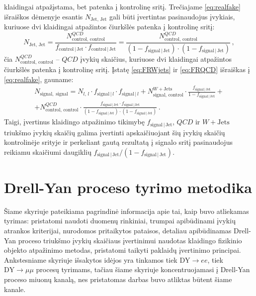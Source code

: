 \documentclass[a4paper, 12pt, oneside]{article}
\newcommand{\WJets}{W\! +\!\mathrm{Jets}}
\newcommand{\DYee}{\mathrm{DY} \! \rightarrow \! ee}
\newcommand{\DYmumu}{\mathrm{DY} \! \rightarrow \! \mu\mu}
\newcommand{\QCD}{QC\! D}
\newlength\q
\begin{document}
klaidingai atpažįstama, bet patenka į kontrolinę sritį.
Trečiajame \eqref{eq:realfake} išraiškos dėmenyje esantis $N_{\mathrm{Jet, \, Jet}}$ gali būti įvertintas pasinaudojus įvykiais,
kuriuose dvi klaidingai atpažintos čiurkšlės patenka į kontrolinę sritį:
\begin{equation}
	\label{eq:FRQCD}
	N_{\mathrm{Jet, \, Jet}} = \frac{N^{\QCD}_{\mathrm{control, \, control}}}{f_{\mathrm{control} \,| \,\mathrm{Jet}} \cdot
	f_{\mathrm{control} \,| \,\mathrm{Jet}}} = \frac{N^{\QCD}_{\mathrm{control, \, control}}}
	{\left(1-f_{\mathrm{signal} \,| \,\mathrm{Jet}}\right) \cdot \left(1-f_{\mathrm{signal} \,| \,\mathrm{Jet}}\right)} \, ,
\end{equation}
čia $N^{\QCD}_{\mathrm{control, \, control}}$ -- $\QCD$ įvykių skaičius, kuriuose dvi klaidingai atpažintos čiurkšlės patenka į
kontrolinę sritį.
Įstatę \eqref{eq:FRWjets} ir \eqref{eq:FRQCD} išraiškas į \eqref{eq:realfake}, gauname:
\begin{multline}
	\label{eq:FRapply}
	N_{\mathrm{signal, \; signal}} = N_{l, \, l} \cdot f_{\mathrm{signal} \,| \,l} \cdot f_{\mathrm{signal} \,| \, l} +
	N^{\WJets}_{\mathrm{signal, \, control}} \cdot
	\frac{f_{\mathrm{signal} \,| \, \mathrm{Jet}}} {1 - f_{\mathrm{signal} \,| \, \mathrm{Jet}}} + \\[5pt] +
	N^{\QCD}_{\mathrm{control, \, control}} \cdot
	\frac{f_{\mathrm{signal} \,| \,\mathrm{Jet}} \cdot f_{\mathrm{signal} \,| \,\mathrm{Jet}}}
	{\left(1-f_{\mathrm{signal} \,| \,\mathrm{Jet}} \right) \cdot \left(1-f_{\mathrm{signal} \,| \,\mathrm{Jet}} \right)}\, .
\end{multline}
Taigi, įvertinus klaidingo atpažinimo tikimybę $f_{\mathrm{signal} \,| \,\mathrm{Jet}}$, $QCD$ ir $\WJets$ triukšmo įvykių
skaičių galima įvertinti apskaičiuojant šių įvykių skaičių kontrolinėje srityje ir perkeliant gautą rezultatą į
signalo sritį pasinaudojus reikiamu skaičiumi daugiklių
$f_{\mathrm{signal} \,| \,\mathrm{Jet}}/(1-f_{\mathrm{signal} \,| \,\mathrm{Jet}})$.

\section{Drell-Yan proceso tyrimo metodika}

Šiame skyriuje pateikiama pagrindinė informacija apie tai, kaip buvo atliekamas tyrimas: pristatomi naudoti
duomenų rinkiniai, trumpai apibūdinami įvykių atrankos kriterijai, nurodomos pritaikytos pataisos, detaliau apibūdinamas
Drell-Yan proceso triukšmo įvykių skaičiaus įvertinimui naudotas klaidingo fizikinio objekto atpažinimo metodas,
pristatomi taikyti paklaidų įvertinimo principai.
Ankstesniame skyriuje išsakytos idėjos yra tinkamos tiek $\DYee$, tiek $\DYmumu$ procesų tyrimams, tačiau šiame skyriuje
koncentruojamasi į Drell-Yan proceso miuonų kanalą, nes pristatomas darbas buvo atliktas būtent šiame kanale.
\end{document}
